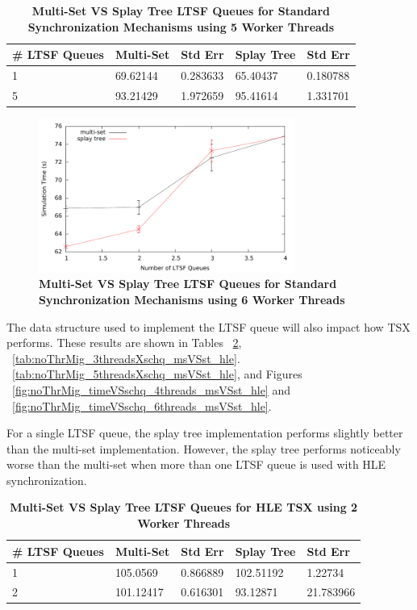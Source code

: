 \documentclass[11pt]{book}
\begin{document}
\begin{table}[H]
\centering
\begin{tabular}{l|p{2cm}|p{2cm}|p{2cm}|p{2cm}}
    \textbf{\# LTSF Queues}&Multi-Set &Std Err &Splay Tree &Std Err\\
    \hline
    \midrule
        1 &69.62144   &0.283633 &65.40437   &0.180788\\ 
        5 &93.21429   &1.972659 &95.41614   &1.331701\\
\end{tabular}
\caption{\textbf{Multi-Set VS Splay Tree LTSF Queues for Standard
Synchronization Mechanisms using 5 Worker Threads}}
\label{tab:noThrMig_5threadsXschq_msVSst_std}
\end{table}

\begin{figure}[H]
    \centering
    \graphicspath{ {./figures/} }
    \includegraphics[width=0.75\textwidth,keepaspectratio]{hugeepidemicsim-NOmig-timeVSschedQs-msVSst-6thread-std}
\caption{\textbf{Multi-Set VS Splay Tree LTSF Queues for Standard
Synchronization Mechanisms using 6 Worker Threads}}
    \label{fig:noThrMig_timeVSschq_6threads_msVSst_std}
\end{figure}

The data structure used to implement the LTSF queue will also impact how TSX
performs.  These results are shown in Tables ~\ref{tab:noThrMig_2threadsXschq_msVSst_hle},
~\ref{tab:noThrMig_3threadsXschq_msVSst_hle}.
~\ref{tab:noThrMig_5threadsXschq_msVSst_hle}, and Figures
~\ref{fig:noThrMig_timeVSschq_4threads_msVSst_hle} and
~\ref{fig:noThrMig_timeVSschq_6threads_msVSst_hle}.

For a single LTSF queue, the splay tree implementation performs slightly better
than the multi-set implementation.  However, the splay tree performs
noticeably worse than the multi-set when more than one LTSF queue is used
with HLE synchronization.  

\begin{table}[H]
    \centering
    \begin{tabular}{l|p{2cm}|p{2cm}|p{2cm}|p{2cm}}
        \textbf{\# LTSF Queues}&Multi-Set &Std Err &Splay Tree &Std Err\\
        \hline
        \midrule
            1 &105.0569   &0.866889 &102.51192  &1.22734  \\ 
            2 &101.12417  &0.616301 &93.12871   &21.783966\\
    \end{tabular}
    \caption{\textbf{Multi-Set VS Splay Tree LTSF Queues for HLE TSX using 2 Worker Threads}}
    \label{tab:noThrMig_2threadsXschq_msVSst_hle}
\end{table}
\end{document}
